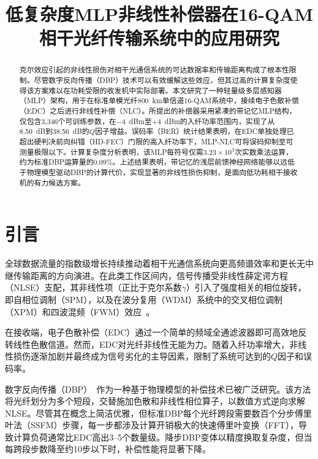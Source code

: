 \documentclass[conference]{IEEEtran}
\begin{document}
\title{低复杂度MLP非线性补偿器在16-QAM相干光纤传输系统中的应用研究}

\author{
}

\maketitle

\begin{abstract}
克尔效应引起的非线性损伤对相干光通信系统的可达数据率和传输距离构成了根本性限制。尽管数字反向传播（DBP）技术可以有效缓解这些效应，但其过高的计算复杂度使得该方案难以在功耗受限的收发机中实际部署。本文研究了一种轻量级多层感知器（MLP）架构，用于在标准单模光纤800~km单信道16-QAM系统中，接续电子色散补偿（EDC）之后进行非线性补偿（NLC）。所提出的补偿器采用紧凑的带记忆MLP结构，仅包含3,346个可训练参数，在$-4$~dBm至$+4$~dBm的入纤功率范围内，实现了从8.50~dB到38.56~dB的$Q$因子增益。误码率（BER）统计结果表明，在EDC单独处理已超出硬判决前向纠错（HD-FEC）门限的高入纤功率下，MLP-NLC可将误码抑制至可测量极限以下。计算复杂度分析表明，该MLP每符号仅需$3.23 \times 10^3$次实数乘法运算，约为标准DBP运算量的0.09\%。上述结果表明，带记忆的浅层前馈神经网络能够以远低于物理模型驱动DBP的计算代价，实现显著的非线性损伤抑制，是面向低功耗相干接收机的有力候选方案。
\end{abstract}

\section{引言}
\label{sec:introduction}

全球数据流量的指数级增长持续推动着相干光通信系统向更高频谱效率和更长无中继传输距离的方向演进。在此类工作区间内，信号传播受非线性薛定谔方程（NLSE）支配，其非线性项（正比于克尔系数$\gamma$）引入了强度相关的相位旋转，即自相位调制（SPM），以及在波分复用（WDM）系统中的交叉相位调制（XPM）和四波混频（FWM）效应~\cite{agrawal2001}。

在接收端，电子色散补偿（EDC）通过一个简单的频域全通滤波器即可高效地反转线性色散信道。然而，EDC对光纤非线性无能为力。随着入纤功率增大，非线性损伤逐渐加剧并最终成为信号劣化的主导因素，限制了系统可达到的$Q$因子和误码率。

数字反向传播（DBP）~\cite{ip2008}作为一种基于物理模型的补偿技术已被广泛研究。该方法将光纤划分为多个短段，交替施加色散和非线性相位算子，以数值方式逆向求解NLSE。尽管其在概念上简洁优雅，但标准DBP每个光纤跨段需要数百个分步傅里叶法（SSFM）步骤，每一步都涉及计算开销极大的快速傅里叶变换（FFT），导致计算负荷通常比EDC高出3--5个数量级。降步DBP变体以精度换取复杂度，但当每跨段步数降至约10步以下时，补偿性能将显著下降。
\end{document}
